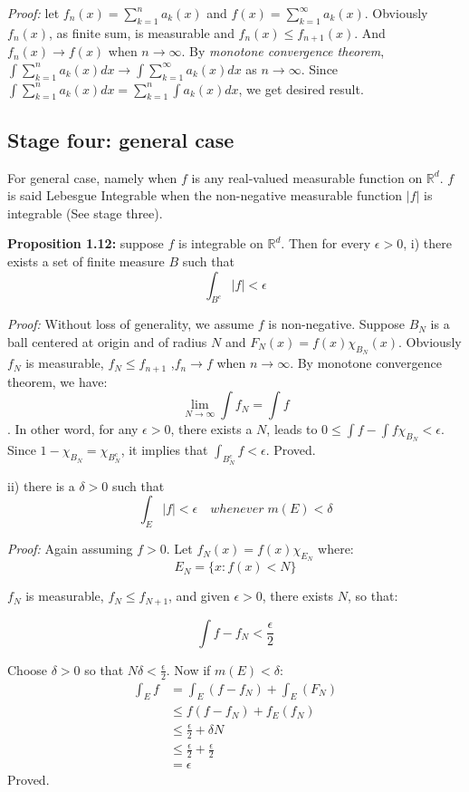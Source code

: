 \documentclass[
]{article}
\begin{document}
\textit{Proof:} let \(f_n(x)=\sum_{k=1}^{n}a_k(x)\) and \(f(x)=\sum_{k=1}^{\infty}a_k(x)\). Obviously \(f_n(x)\), as finite sum, is measurable
and \(f_n(x)\leq f_{n+1}(x)\). And \(f_n(x)\to f(x)\) when  \(n\to\infty\). By \textit{monotone convergence theorem},
\(\int \sum_{k=1}^na_k(x)dx\to \int \sum_{k=1}^{\infty}a_k(x)dx\) as \(n\to\infty\). Since \(\int \sum_{k=1}^na_k(x)dx=\sum_{k=1}^n\int a_k(x)dx\),
we get desired result.

\subsection{Stage four: general case}
For general case, namely when \(f\) is any real-valued measurable function on \(\mathbb{R}^d\).
\(f\) is said Lebesgue Integrable when the non-negative measurable function \(|f|\) is integrable
(See stage three).

\textbf{Proposition 1.12:} suppose \(f\) is integrable on \(\mathbb{R}^d\). Then for every \(\epsilon > 0\),
i) there exists a set of finite measure \(B\) such that
\[\int_{B^c}|f|<\epsilon\]

\textit{Proof:}
Without loss of generality, we assume \(f\) is non-negative. Suppose \(B_N\) is a ball centered at origin and of radius 
\(N\) and \(F_N(x) = f(x)\chi_{B_N}(x)\). Obviously \(f_N\) is measurable, \(f_N \leq f_{n+1}\)
,\(f_n \to f\) when \(n \to \infty\). By monotone convergence theorem, we have:
\[\lim_{N\to\infty}\int f_N=\int f\]. In other word, for any \(\epsilon > 0\), there exists a \(N\),
leads to \(0 \leq \int f - \int f\chi_{B_N} < \epsilon\). Since \(1-\chi_{B_N}=\chi_{B_N^c}\), it implies
that \(\int_{B_N^c}f < \epsilon\). Proved.

ii) there is a \(\delta > 0 \) such that
\[\int_E|f|<\epsilon\quad whenever\; m(E)<\delta\] 

\textit{Proof:}
Again assuming \(f > 0 \). Let \(f_N(x)=f(x)\chi_{E_N}\) where:
\[E_N=\{x: f(x)<N\}\]

\(f_N\) is measurable, \(f_N \leq f_{N+1}\), and given \(\epsilon>0\), there exists \(N\), so that:

\[\int f - f_N < \frac{\epsilon}{2}\]

Choose \(\delta > 0\) so that \(N\delta < \frac{\epsilon}{2}\). Now if \(m(E)<\delta\):
\[
  \begin{split}
  \int_E f &= \int_E(f-f_N)+\int_E(F_N)\\
  &\leq f (f - f_N) + f_E(f_N)\\
  &\leq \frac{\epsilon}{2}+\delta N\\
  &\leq \frac{\epsilon}{2}+\frac{\epsilon}{2}\\
  &=\epsilon
  \end{split}
  \]
Proved.
\end{document}
